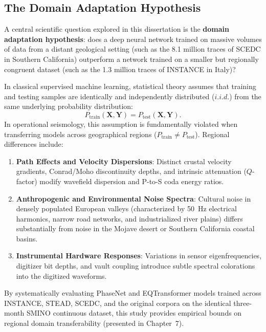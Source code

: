 \subsection{The Domain Adaptation Hypothesis}
\label{subsec:domain_adaptation_hypothesis}

A central scientific question explored in this dissertation is the \textbf{domain adaptation hypothesis}: does a deep neural network trained on massive volumes of data from a distant geological setting (such as the 8.1 million traces of SCEDC in Southern California) outperform a network trained on a smaller but regionally congruent dataset (such as the 1.3 million traces of INSTANCE in Italy)?

In classical supervised machine learning, statistical theory assumes that training and testing samples are identically and independently distributed ($i.i.d.$) from the same underlying probability distribution:
\begin{equation}
  P_{\mathrm{train}}(\mathbf{X}, \mathbf{Y}) = P_{\mathrm{test}}(\mathbf{X}, \mathbf{Y}).
  \label{eq:iid_assumption}
\end{equation}
In operational seismology, this assumption is fundamentally violated when transferring models across geographical regions ($P_{\mathrm{train}} \neq P_{\mathrm{test}}$). Regional differences include:
\begin{enumerate}
  \item \textbf{Path Effects and Velocity Dispersions}: Distinct crustal velocity gradients, Conrad/Moho discontinuity depths, and intrinsic attenuation ($Q$-factor) modify wavefield dispersion and P-to-S coda energy ratios.
  \item \textbf{Anthropogenic and Environmental Noise Spectra}: Cultural noise in densely populated European valleys (characterized by 50~Hz electrical harmonics, narrow road networks, and industrialized river plains) differs substantially from noise in the Mojave desert or Southern California coastal basins.
  \item \textbf{Instrumental Hardware Responses}: Variations in sensor eigenfrequencies, digitizer bit depths, and vault coupling introduce subtle spectral colorations into the digitized waveforms.
\end{enumerate}

By systematically evaluating PhaseNet and EQTransformer models trained across INSTANCE, STEAD, SCEDC, and the original corpora on the identical three-month SMINO continuous dataset, this study provides empirical bounds on regional domain transferability (presented in Chapter~7).
